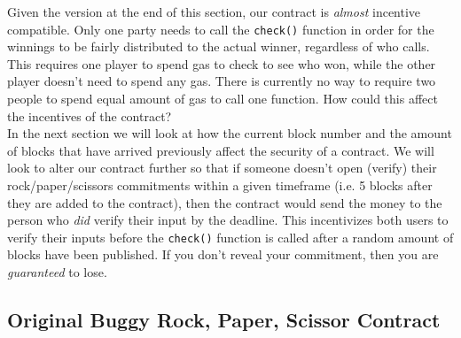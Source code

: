 \documentclass[12pt]{article}
\begin{document}
Given the version at the end of this section, our contract is \textit{almost} incentive compatible. Only one party needs to call the \texttt{check()} function in order for the winnings to be fairly distributed to the actual winner, regardless of who calls. This requires one player to spend gas to check to see who won, while the other player doesn't need to spend any gas. There is currently no way to require two people to spend equal amount of gas to call one function. How could this affect the incentives of the contract? \\

In the next section we will look at how the current block number and the amount of blocks that have arrived previously affect the security of a contract. We will look to alter our contract further so that if someone doesn't open (verify) their rock/paper/scissors commitments within a given timeframe (i.e. 5 blocks after they are added to the contract), then the contract would send the money to the person who \textit{did} verify their input by the deadline. This incentivizes both users to verify their inputs before the \texttt{check()} function is called after a random amount of blocks have been published. If you don't reveal your commitment, then you are \textit{guaranteed} to lose.


\subsection{Original Buggy Rock, Paper, Scissor Contract}
\end{document}
